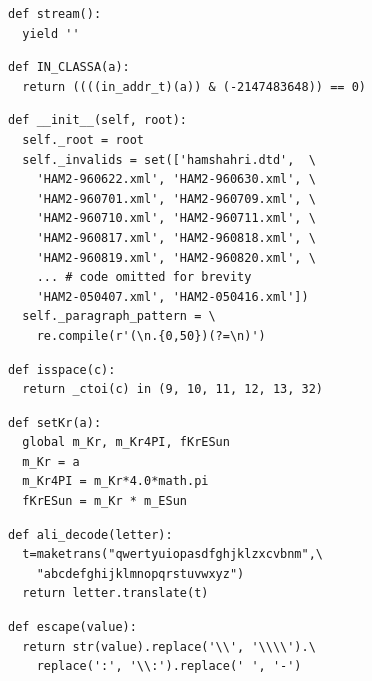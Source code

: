 \documentclass[conference]{ieeetran}
\begin{document}
\begin{verbatim}
def stream():
  yield ''
\end{verbatim}

\begin{verbatim}
def IN_CLASSA(a):
  return ((((in_addr_t)(a)) & (-2147483648)) == 0)
\end{verbatim}

\begin{verbatim}
def __init__(self, root):
  self._root = root
  self._invalids = set(['hamshahri.dtd',  \
    'HAM2-960622.xml', 'HAM2-960630.xml', \
    'HAM2-960701.xml', 'HAM2-960709.xml', \
    'HAM2-960710.xml', 'HAM2-960711.xml', \
    'HAM2-960817.xml', 'HAM2-960818.xml', \
    'HAM2-960819.xml', 'HAM2-960820.xml', \
    ... # code omitted for brevity
    'HAM2-050407.xml', 'HAM2-050416.xml'])
  self._paragraph_pattern = \
    re.compile(r'(\n.{0,50})(?=\n)')
\end{verbatim}

\begin{verbatim}
def isspace(c):
  return _ctoi(c) in (9, 10, 11, 12, 13, 32)
\end{verbatim}

\begin{verbatim}
def setKr(a):
  global m_Kr, m_Kr4PI, fKrESun
  m_Kr = a
  m_Kr4PI = m_Kr*4.0*math.pi
  fKrESun = m_Kr * m_ESun
\end{verbatim}

\begin{verbatim}
def ali_decode(letter):
  t=maketrans("qwertyuiopasdfghjklzxcvbnm",\
    "abcdefghijklmnopqrstuvwxyz")
  return letter.translate(t)
\end{verbatim}

\begin{verbatim}
def escape(value):
  return str(value).replace('\\', '\\\\').\
    replace(':', '\\:').replace(' ', '-')
\end{verbatim}
\end{document}
